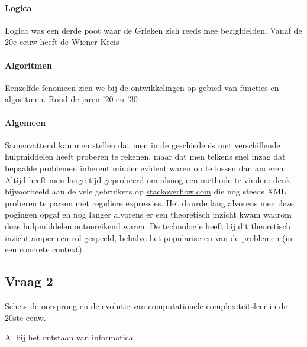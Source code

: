 \documentclass[../main.tex]{subfiles}
\begin{document}
\begin{solution}
\paragraph{Logica}
Logica was een derde poot waar de Grieken zich reeds mee bezighielden. Vanaf de
20e eeuw heeft de Wiener Kreis 

\paragraph{Algoritmen}
Eenzelfde fenomeen zien we bij de ontwikkelingen op gebied van functies en algoritmen.
Rond de jaren '20 en '30

\paragraph{Algemeen}
Samenvattend kan men stellen dat men in de geschiedenis met verschillende hulpmiddelen
heeft proberen te rekenen, maar dat men telkens snel inzag dat bepaalde problemen
inherent minder evident waren op te lossen dan anderen. Altijd heeft men lange
tijd geprobeerd om alsnog een methode te vinden: denk bijvoorbeeld aan de vele
gebruikers op \url{stackoverflow.com} die nog steeds XML proberen te parsen met
reguliere expressies. Het duurde lang alvorens men deze pogingen opgaf en nog
langer alvorens er een theoretisch inzicht kwam waarom deze hulpmiddelen ontoereikend
waren. De technologie heeft bij dit theoretisch inzicht amper een rol gespeeld,
behalve het populariseren van de problemen (in een concrete context).
\end{solution}


\subsection{Vraag 2}
\begin{question}
Schets de oorsprong en de evolutie van computationele complexiteitsleer in de 20ste
eeuw.
\end{question}
\begin{solution}
Al bij het ontstaan van informatica
\end{solution}
\end{document}
